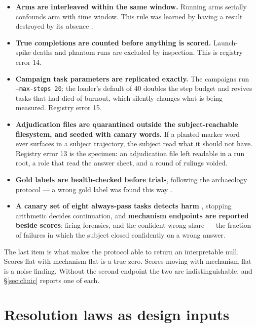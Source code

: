 \begin{itemize}
  \item \textbf{Arms are interleaved within the same window.} Running arms
        serially confounds arm with time window. This rule was learned by
        having a result destroyed by its absence .
  \item \textbf{True completions are counted before anything is scored.}
        Launch-spike deaths and phantom runs are excluded by inspection.
        This is registry error 14.
  \item \textbf{Campaign task parameters are replicated exactly.} The
        campaigns run \texttt{--max-steps 20}; the loader's default of 40
        doubles the step budget and revives tasks that had died of burnout,
        which silently changes what is being measured. Registry error 15.
  \item \textbf{Adjudication files are quarantined outside the
        subject-reachable filesystem, and seeded with canary words.} If a
        planted marker word ever surfaces in a subject trajectory, the
        subject read what it should not have. Registry error 13 is the
        specimen: an adjudication file left readable in a run root, a role
        that read the answer sheet, and a round of rulings voided.
  \item \textbf{Gold labels are health-checked before trials}, following
        the archaeology protocol --- a wrong gold label was found this way
        .
  \item \textbf{A canary set of eight always-pass tasks detects harm}
        , stopping arithmetic decides continuation, and
        \textbf{mechanism endpoints are reported beside scores}: firing
        forensics, and the confident-wrong share --- the fraction of
        failures in which the subject closed confidently on a wrong
        answer.
\end{itemize}

The last item is what makes the protocol able to return an interpretable
null. Scores flat with mechanism flat is a true zero. Scores moving with
mechanism flat is a noise finding. Without the second endpoint the two are
indistinguishable, and \S\ref{sec:clinic} reports one of each.

\section{Resolution laws as design inputs}
\label{sec:resolution}

